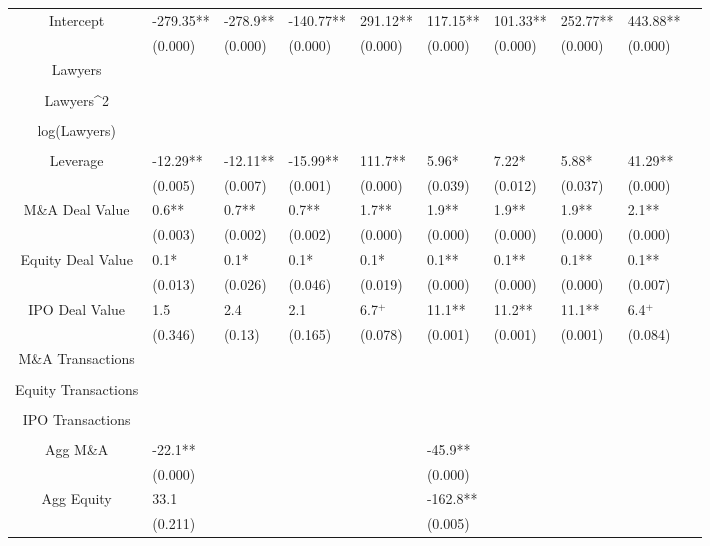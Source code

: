\documentclass{article}
\begin{document}
\begin{table}[H]
\begin{tabular}{|clllllllll|}
Intercept & -279.35** & -278.9** & -140.77** & 291.12** & 117.15** & 101.33** & 252.77** & 443.88** & \\ 
   & (0.000) & (0.000) & (0.000) & (0.000) & (0.000) & (0.000) & (0.000) & (0.000) & \\ 
  Lawyers &  &  &  &  &  &  &  &  & \\ 
   &  &  &  &  &  &  &  &  & \\ 
  Lawyers^2 &  &  &  &  &  &  &  &  & \\ 
   &  &  &  &  &  &  &  &  & \\ 
  log(Lawyers) &  &  &  &  &  &  &  &  & \\ 
   &  &  &  &  &  &  &  &  & \\ 
  Leverage & -12.29** & -12.11** & -15.99** & 111.7** & 5.96* & 7.22* & 5.88* & 41.29** & \\ 
   & (0.005) & (0.007) & (0.001) & (0.000) & (0.039) & (0.012) & (0.037) & (0.000) & \\ 
  M\&A Deal Value & 0.6** & 0.7** & 0.7** & 1.7** & 1.9** & 1.9** & 1.9** & 2.1** & \\ 
   & (0.003) & (0.002) & (0.002) & (0.000) & (0.000) & (0.000) & (0.000) & (0.000) & \\ 
  Equity Deal Value & 0.1* & 0.1* & 0.1* & 0.1* & 0.1** & 0.1** & 0.1** & 0.1** & \\ 
   & (0.013) & (0.026) & (0.046) & (0.019) & (0.000) & (0.000) & (0.000) & (0.007) & \\ 
  IPO Deal Value & 1.5 & 2.4 & 2.1 & 6.7$^{+}$ & 11.1** & 11.2** & 11.1** & 6.4$^{+}$ & \\ 
   & (0.346) & (0.13) & (0.165) & (0.078) & (0.001) & (0.001) & (0.001) & (0.084) & \\ 
  M\&A Transactions &  &  &  &  &  &  &  &  & \\ 
   &  &  &  &  &  &  &  &  & \\ 
  Equity Transactions &  &  &  &  &  &  &  &  & \\ 
   &  &  &  &  &  &  &  &  & \\ 
  IPO Transactions &  &  &  &  &  &  &  &  & \\ 
   &  &  &  &  &  &  &  &  & \\ 
  Agg M\&A & -22.1** &  &  &  & -45.9** &  &  &  & \\ 
   & (0.000) &  &  &  & (0.000) &  &  &  & \\ 
  Agg Equity & 33.1 &  &  &  & -162.8** &  &  &  & \\ 
   & (0.211) &  &  &  & (0.005) &  &  &  & \\ 

\end{tabular}
\end{table}
\end{document}
